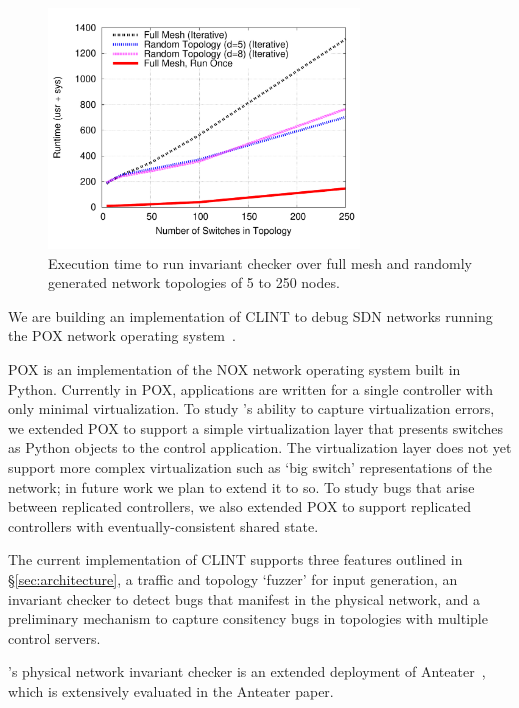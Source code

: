 
    \begin{figure}[t]
        \hspace{-10pt}
        \includegraphics[width=3.25in]{../graphs/crummy_overhead_graph/graph.pdf}
        \caption[]{\label{fig:anteatertime} Execution time to run invariant checker over full mesh and randomly generated network topologies of 5 to 250 nodes.} 
    \end{figure}

    We are building an implementation of CLINT to debug SDN networks running the POX network operating system~\cite{pox}.
    
    POX is an implementation of the NOX network operating system built in Python.
    Currently in POX, applications are written for a single controller with only minimal virtualization.
    To study \projectname{}'s ability to capture virtualization errors, we extended POX
    to support a simple virtualization layer that presents switches as Python objects to the control application.
    The virtualization layer does not yet support more complex virtualization such as `big switch' representations 
    of the network; in future work we plan to extend it to so.
    To study bugs that arise between replicated controllers, we also extended POX to support replicated controllers
    with eventually-consistent shared state.

    The current implementation of CLINT supports three features outlined in
    \S\ref{sec:architecture}, a traffic and topology `fuzzer' for input
    generation, an invariant checker to detect bugs that manifest in the
    physical network, and a preliminary mechanism to capture consitency bugs in topologies
    with multiple control servers.
    
    \projectname{}'s physical network invariant checker is an extended deployment of Anteater~\cite{anteater}, which is extensively evaluated in the Anteater paper.

